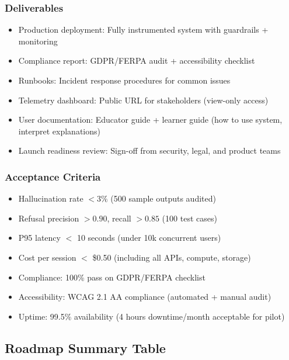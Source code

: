 \documentclass[11pt,letterpaper]{article}
\begin{document}
\subsubsection{Deliverables}
\begin{itemize}
\item Production deployment: Fully instrumented system with guardrails + monitoring
\item Compliance report: GDPR/FERPA audit + accessibility checklist
\item Runbooks: Incident response procedures for common issues
\item Telemetry dashboard: Public URL for stakeholders (view-only access)
\item User documentation: Educator guide + learner guide (how to use system, interpret explanations)
\item Launch readiness review: Sign-off from security, legal, and product teams
\end{itemize}

\subsubsection{Acceptance Criteria}
\begin{itemize}
\item Hallucination rate $< 3\%$ (500 sample outputs audited)
\item Refusal precision $> 0.90$, recall $> 0.85$ (100 test cases)
\item P95 latency $<$ 10 seconds (under 10k concurrent users)
\item Cost per session $<$ \$0.50 (including all APIs, compute, storage)
\item Compliance: 100\% pass on GDPR/FERPA checklist
\item Accessibility: WCAG 2.1 AA compliance (automated + manual audit)
\item Uptime: 99.5\% availability (4 hours downtime/month acceptable for pilot)
\end{itemize}

\subsection{Roadmap Summary Table}\label{subsec:roadmap-summary}
\end{document}
